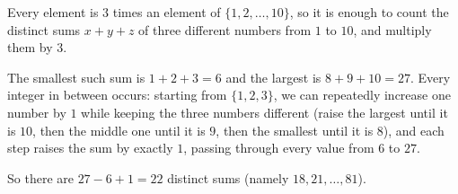 Every element is $3$ times an element of $\{1,2,\dots,10\}$, so it is enough to count the distinct sums $x+y+z$ of three different numbers from $1$ to $10$, and multiply them by $3$.

The smallest such sum is $1+2+3=6$ and the largest is $8+9+10=27$. Every integer in between occurs: starting from $\{1,2,3\}$, we can repeatedly increase one number by $1$ while keeping the three numbers different (raise the largest until it is $10$, then the middle one until it is $9$, then the smallest until it is $8$), and each step raises the sum by exactly $1$, passing through every value from $6$ to $27$.

So there are $27-6+1=\boxed{22}$ distinct sums (namely $18,21,\dots,81$).
